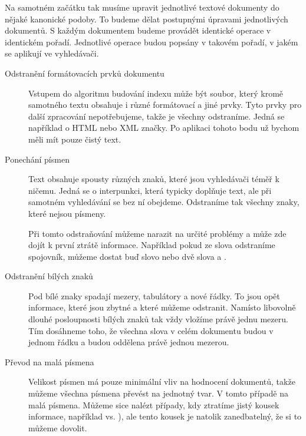 \documentclass[12pt]{article}
\newcommand{\code}[1]{\texttt{#1}}
\begin{document}
Na samotném začátku tak musíme upravit jednotlivé textové dokumenty do nějaké kanonické podoby. To budeme dělat postupnými úpravami jednotlivých dokumentů. S každým dokumentem budeme provádět identické operace v identickém pořadí. Jednotlivé operace budou popsány v takovém pořadí, v jakém se aplikují ve vyhledávači. 

\begin{description}

\item[Odstranění formátovacích prvků dokumentu] Vstupem do algoritmu budování indexu může být soubor, který kromě samotného textu obsahuje i různé formátovací a jiné prvky. Tyto prvky pro další zpracování nepotřebujeme, takže je všechny odstraníme. Jedná se například o HTML nebo XML značky. Po aplikaci tohoto bodu už bychom měli mít pouze čistý text. 

\item[Ponechání písmen] Text obsahuje spousty různých znaků, které jsou vyhledávači téměř k ničemu. Jedná se o interpunkci, která typicky doplňuje text, ale při samotném vyhledávání se bez ní obejdeme. Odstraníme tak všechny znaky, které nejsou písmeny. 

Při tomto odstraňování můžeme narazit na určité problémy a může zde dojít k první ztrátě informace. Například pokud ze slova  odstraníme spojovník, můžeme dostat buď slovo  nebo dvě slova  a . 

\item[Odstranění bílých znaků] Pod bílé znaky spadají mezery, tabulátory a nové řádky. To jsou opět informace, které jsou zbytné a které můžeme odstranit. Namísto libovolně dlouhé posloupnosti bílých znaků tak vždy vložíme právě jednu mezeru. Tím dosáhneme toho, že všechna slova v celém dokumentu budou v jednom řádku a budou oddělena právě jednou mezerou. 

\item[Převod na malá písmena] Velikost písmen má pouze minimální vliv na hodnocení dokumentů, takže můžeme všechna písmena převést na jednotný tvar. V tomto případě na malá písmena. Můžeme sice nalézt případy, kdy ztratíme jistý kousek informace, například  vs. ), ale tento kousek je natolik zanedbatelný, že si to můžeme dovolit. 


\end{description}
\end{document}
